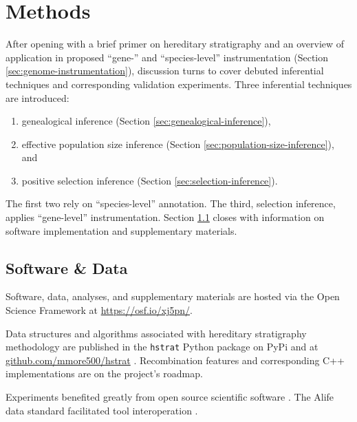 \section{Methods} \label{sec:methods}

After opening with a brief primer on hereditary stratigraphy and an overview of application in proposed ``gene-'' and ``species-level'' instrumentation (Section \ref{sec:genome-instrumentation}), discussion turns to cover debuted inferential techniques and corresponding validation experiments.
Three inferential techniques are introduced:
\begin{enumerate}
\item genealogical inference (Section \ref{sec:genealogical-inference}),
\item effective population size inference (Section \ref{sec:population-size-inference}), and
\item positive selection inference (Section \ref{sec:selection-inference}).
\end{enumerate}

The first two rely on ``species-level'' annotation.
The third, selection inference, applies ``gene-level'' instrumentation.
Section \ref{sec:software-data} closes with information on software implementation and supplementary materials.









\subsection{Software \& Data}
\label{sec:software-data}

Software, data, analyses, and supplementary materials are hosted via the Open Science Framework at \url{https://osf.io/xj5pn/}.

Data structures and algorithms associated with hereditary stratigraphy methodology are published in the \texttt{hstrat} Python package on PyPi and at \url{github.com/mmore500/hstrat} \citep{moreno2022hstrat}.
Recombination features and corresponding C++ implementations are on the project's roadmap.

Experiments benefited greatly from open source scientific software \citep{cock2009biopython,fortin2012deap,sand2014tqdist}.
The Alife data standard facilitated tool interoperation \citep{lalejini2019data}.

